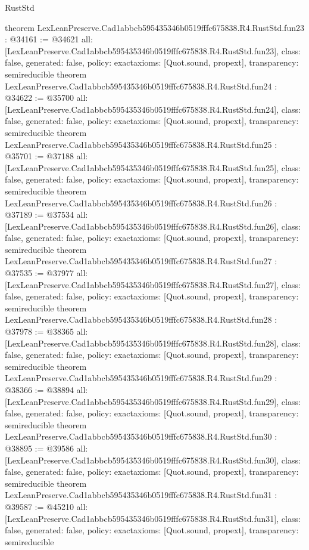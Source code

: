 \begin{lexlean}{RustStd}
\begin{coremodule}
{}
theorem LexLeanPreserve.Cad1abbcb595435346b0519fffc675838.R4.RustStd.fun23 : @34161 := @34621 {
  all: [LexLeanPreserve.Cad1abbcb595435346b0519fffc675838.R4.RustStd.fun23],
  class: false,
  generated: false,
  policy: exact{axioms: [Quot.sound, propext]},
  transparency: semireducible
}
theorem LexLeanPreserve.Cad1abbcb595435346b0519fffc675838.R4.RustStd.fun24 : @34622 := @35700 {
  all: [LexLeanPreserve.Cad1abbcb595435346b0519fffc675838.R4.RustStd.fun24],
  class: false,
  generated: false,
  policy: exact{axioms: [Quot.sound, propext]},
  transparency: semireducible
}
theorem LexLeanPreserve.Cad1abbcb595435346b0519fffc675838.R4.RustStd.fun25 : @35701 := @37188 {
  all: [LexLeanPreserve.Cad1abbcb595435346b0519fffc675838.R4.RustStd.fun25],
  class: false,
  generated: false,
  policy: exact{axioms: [Quot.sound, propext]},
  transparency: semireducible
}
theorem LexLeanPreserve.Cad1abbcb595435346b0519fffc675838.R4.RustStd.fun26 : @37189 := @37534 {
  all: [LexLeanPreserve.Cad1abbcb595435346b0519fffc675838.R4.RustStd.fun26],
  class: false,
  generated: false,
  policy: exact{axioms: [Quot.sound, propext]},
  transparency: semireducible
}
theorem LexLeanPreserve.Cad1abbcb595435346b0519fffc675838.R4.RustStd.fun27 : @37535 := @37977 {
  all: [LexLeanPreserve.Cad1abbcb595435346b0519fffc675838.R4.RustStd.fun27],
  class: false,
  generated: false,
  policy: exact{axioms: [Quot.sound, propext]},
  transparency: semireducible
}
theorem LexLeanPreserve.Cad1abbcb595435346b0519fffc675838.R4.RustStd.fun28 : @37978 := @38365 {
  all: [LexLeanPreserve.Cad1abbcb595435346b0519fffc675838.R4.RustStd.fun28],
  class: false,
  generated: false,
  policy: exact{axioms: [Quot.sound, propext]},
  transparency: semireducible
}
theorem LexLeanPreserve.Cad1abbcb595435346b0519fffc675838.R4.RustStd.fun29 : @38366 := @38894 {
  all: [LexLeanPreserve.Cad1abbcb595435346b0519fffc675838.R4.RustStd.fun29],
  class: false,
  generated: false,
  policy: exact{axioms: [Quot.sound, propext]},
  transparency: semireducible
}
theorem LexLeanPreserve.Cad1abbcb595435346b0519fffc675838.R4.RustStd.fun30 : @38895 := @39586 {
  all: [LexLeanPreserve.Cad1abbcb595435346b0519fffc675838.R4.RustStd.fun30],
  class: false,
  generated: false,
  policy: exact{axioms: [Quot.sound, propext]},
  transparency: semireducible
}
theorem LexLeanPreserve.Cad1abbcb595435346b0519fffc675838.R4.RustStd.fun31 : @39587 := @45210 {
  all: [LexLeanPreserve.Cad1abbcb595435346b0519fffc675838.R4.RustStd.fun31],
  class: false,
  generated: false,
  policy: exact{axioms: [Quot.sound, propext]},
  transparency: semireducible
}
\end{coremodule}
\end{lexlean}
